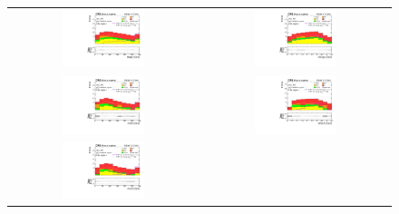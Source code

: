 \begin{figure}[tbh!]
 \begin{center}
 \begin{tabular}{cc}
 \includegraphics[width=0.45\textwidth]{figures/Part4/Evt/LFVemuM}&
  \includegraphics[width=0.45\textwidth]{figures/Part4/Evt/LFVemuDr}\\
 \includegraphics[width=0.45\textwidth]{figures/Part4/Evt/LFVetaM}&
  \includegraphics[width=0.45\textwidth]{figures/Part4/Evt/LFVetaDr}\\
 \includegraphics[width=0.45\textwidth]{figures/Part4/Evt/LFVmutaM}&

\end{tabular}
\end{center}
\end{figure}
